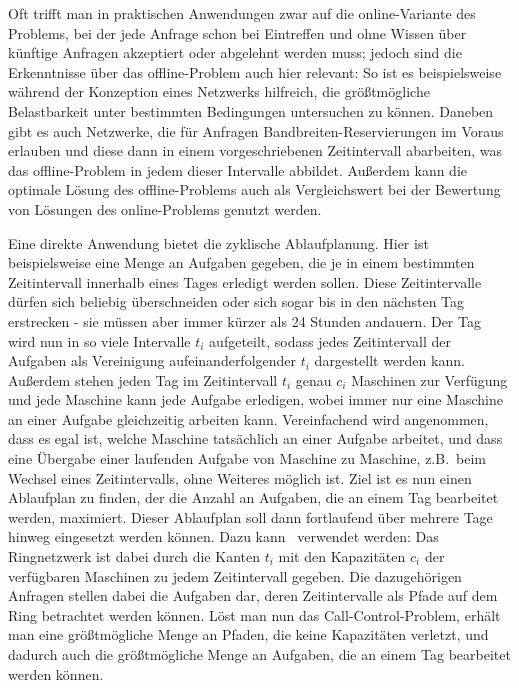 Oft trifft man in praktischen Anwendungen zwar auf die online-Variante des Problems, bei der jede Anfrage schon bei Eintreffen und
ohne Wissen über künftige Anfragen akzeptiert oder abgelehnt werden muss;
jedoch sind die Erkenntnisse über das offline-Problem auch hier relevant:
So ist es beispielsweise während der Konzeption eines Netzwerks hilfreich, die größtmögliche Belastbarkeit unter bestimmten 
Bedingungen untersuchen zu können.
Daneben gibt es auch Netzwerke, die für Anfragen Bandbreiten-Reservierungen im Voraus erlauben und diese dann in einem 
vorgeschriebenen Zeitintervall abarbeiten, was das offline-Problem in jedem dieser Intervalle abbildet.
Außerdem kann die optimale Lösung des offline-Problems auch als Vergleichswert bei der Bewertung von Lösungen des
online-Problems genutzt werden.

Eine direkte Anwendung bietet die zyklische Ablaufplanung.
Hier ist beispielsweise eine Menge an Aufgaben gegeben, die je in einem bestimmten Zeitintervall innerhalb eines Tages erledigt werden sollen.
Diese Zeitintervalle dürfen sich beliebig überschneiden oder sich sogar bis in den nächsten Tag erstrecken - sie müssen aber immer kürzer 
als 24 Stunden andauern.
Der Tag wird nun in so viele Intervalle $t_i$ aufgeteilt, sodass jedes Zeitintervall der Aufgaben als Vereinigung  
aufeinanderfolgender $t_i$ dargestellt werden kann.
Außerdem stehen jeden Tag im Zeitintervall $t_i$ genau $c_i$ Maschinen zur Verfügung und jede Maschine kann jede Aufgabe erledigen, wobei immer nur 
eine Maschine an einer Aufgabe gleichzeitig arbeiten kann.
Vereinfachend wird angenommen, dass es egal ist, welche Maschine tatsächlich an einer Aufgabe arbeitet, und dass eine Übergabe einer laufenden
Aufgabe von Maschine zu Maschine, z.B.\ beim Wechsel eines Zeitintervalls, ohne Weiteres möglich ist.
Ziel ist es nun einen Ablaufplan zu finden, der die Anzahl an Aufgaben, die an einem Tag bearbeitet werden, maximiert.
Dieser Ablaufplan soll dann fortlaufend über mehrere Tage hinweg eingesetzt werden können.
Dazu kann \CallControl\ verwendet werden: Das Ringnetzwerk ist dabei durch die Kanten $t_i$ mit den Kapazitäten $c_i$ der verfügbaren Maschinen
zu jedem Zeitintervall gegeben. Die dazugehörigen Anfragen stellen dabei die Aufgaben dar, deren Zeitintervalle als Pfade auf dem Ring betrachtet
werden können.
Löst man nun das Call-Control-Problem, erhält man eine größtmögliche Menge an Pfaden, die keine Kapazitäten verletzt, und dadurch auch die
größtmögliche Menge an Aufgaben, die an einem Tag bearbeitet werden können.
